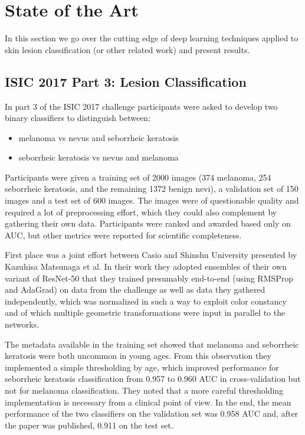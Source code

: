 \chapter{State of the Art}
\label{chapter:sota}

In this section we go over the cutting edge of deep learning techniques applied to skin lesion classification (or other related work) and present results.

\section{ISIC 2017 Part 3: Lesion Classification}
In part 3 of the ISIC 2017 challenge participants were asked to develop two binary classifiers to distinguish between:

\begin{itemize}
    \item melanoma vs nevus and seborrheic keratosis
    \item seborrheic keratosis vs nevus and melanoma
\end{itemize}

Participants were given a training set of 2000 images (374 melanoma, 254 seborrheic keratosis, and the remaining 1372 benign nevi), a validation set of 150 images and a test set of 600 images. The images were of questionable quality and required a lot of preprocessing effort, which they could also complement by gathering their own data. Participants were ranked and awarded based only on AUC, but other metrics were reported for scientific completeness.

First place was a joint effort between Casio and Shinshu University presented by Kazuhisa Matsunaga et al\cite{isic2017first}. In their work they adopted ensembles of their own variant of ResNet-50 that they trained presumably end-to-end (using RMSProp\cite{rmsprop} and AdaGrad\cite{adagrad}) on data from the challenge as well as data they gathered independently, which was normalized in such a way to exploit color constancy and of which multiple geometric transformations were input in parallel to the networks.

The metadata available in the training set showed that melanoma and seborrheic keratosis were both uncommon in young ages. From this observation they implemented a simple thresholding by age, which improved performance for seborrheic keratosis classification from 0.957 to 0.960 AUC in cross-validation but not for melanoma classification. They noted that a more careful thresholding implementation is necessary from a clinical point of view. In the end, the mean performance of the two classifiers on the validation set was 0.958 AUC and, after the paper was published, 0.911 on the test set.

